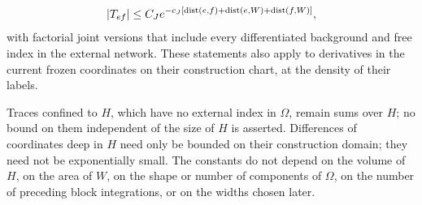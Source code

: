 \begin{lemma}
\begin{enumerate}
\[
 |T_{ef}|\le C_Je^{-c_J[\operatorname{dist}(e,f)+\operatorname{dist}(e,W)+\operatorname{dist}(f,W)]},
\]
with factorial joint versions that include every differentiated background and free index in the external network. These statements also apply to derivatives in the current frozen coordinates on their construction chart, at the density of their labels.
\end{enumerate}
Traces confined to $H$, which have no external index in $\Omega$, remain sums over $H$; no bound on them independent of the size of $H$ is asserted. Differences of coordinates deep in $H$ need only be bounded on their construction domain; they need not be exponentially small. The constants do not depend on the volume of $H$, on the area of $W$, on the shape or number of components of $\Omega$, on the number of preceding block integrations, or on the widths chosen later.
\end{lemma}

